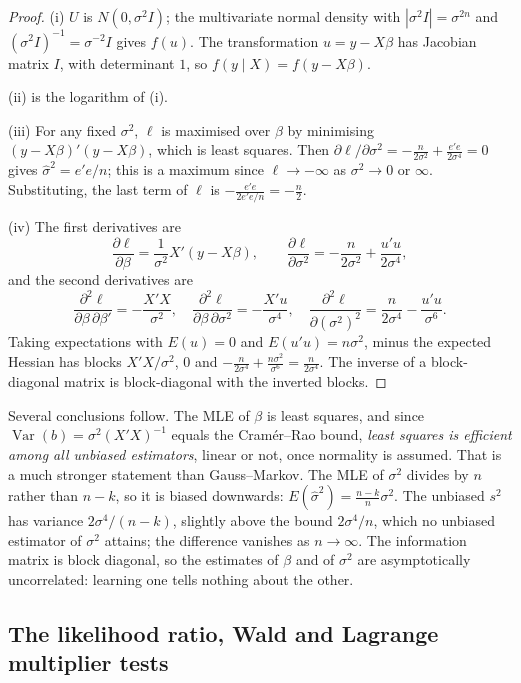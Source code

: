 \documentclass[11pt,a4paper]{article}
\numberwithin{equation}{section}
\DeclareMathOperator{\Var}{Var}
\theoremstyle{definition}
\begin{document}
\begin{proof}
(i) $U$ is $N(0, \sigma^2I)$; the multivariate normal density with $|\sigma^2I| = \sigma^{2n}$ and $(\sigma^2I)^{-1} = \sigma^{-2}I$ gives $f(u)$. The transformation
$u = y - X\beta$ has Jacobian matrix $I$, with determinant $1$, so $f(y \mid X) = f(y - X\beta)$.

(ii) is the logarithm of (i).

(iii) For any fixed $\sigma^2$, $\ell$ is maximised over $\beta$ by minimising $(y - X\beta)'(y - X\beta)$, which is least squares. Then
$\partial\ell/\partial\sigma^2 = -\frac{n}{2\sigma^2} + \frac{e'e}{2\sigma^4} = 0$ gives $\hat\sigma^2 = e'e/n$; this is a maximum since $\ell \to -\infty$ as $\sigma^2 \to 0$ or $\infty$.
Substituting, the last term of $\ell$ is $-\frac{e'e}{2e'e/n} = -\frac n2$.

(iv) The first derivatives are
\[
\frac{\partial\ell}{\partial\beta} = \frac{1}{\sigma^2}X'(y - X\beta), \qquad \frac{\partial\ell}{\partial\sigma^2} = -\frac{n}{2\sigma^2} + \frac{u'u}{2\sigma^4},
\]
and the second derivatives are
\[
\frac{\partial^2\ell}{\partial\beta\,\partial\beta'} = -\frac{X'X}{\sigma^2}, \quad
\frac{\partial^2\ell}{\partial\beta\,\partial\sigma^2} = -\frac{X'u}{\sigma^4}, \quad
\frac{\partial^2\ell}{\partial(\sigma^2)^2} = \frac{n}{2\sigma^4} - \frac{u'u}{\sigma^6} .
\]
Taking expectations with $E(u) = 0$ and $E(u'u) = n\sigma^2$, minus the expected Hessian has blocks $X'X/\sigma^2$, $0$ and $-\frac{n}{2\sigma^4} + \frac{n\sigma^2}{\sigma^6} = \frac{n}{2\sigma^4}$.
The inverse of a block-diagonal matrix is block-diagonal with the inverted blocks.
\end{proof}

Several conclusions follow. The MLE of $\beta$ is least squares, and since $\Var(b) = \sigma^2(X'X)^{-1}$ equals the Cram\'er--Rao bound, \emph{least squares is efficient
among all unbiased estimators}, linear or not, once normality is assumed. That is a much stronger statement than Gauss--Markov. The MLE of $\sigma^2$
divides by $n$ rather than $n - k$, so it is biased downwards: $E(\hat\sigma^2) = \frac{n-k}{n}\sigma^2$. The unbiased $s^2$ has variance $2\sigma^4/(n - k)$, slightly above the
bound $2\sigma^4/n$, which no unbiased estimator of $\sigma^2$ attains; the difference vanishes as $n \to \infty$. The information matrix is block diagonal,
so the estimates of $\beta$ and of $\sigma^2$ are asymptotically uncorrelated: learning one tells nothing about the other.

\subsection{The likelihood ratio, Wald and Lagrange multiplier tests}
\label{ssec:trinity}
\end{document}
